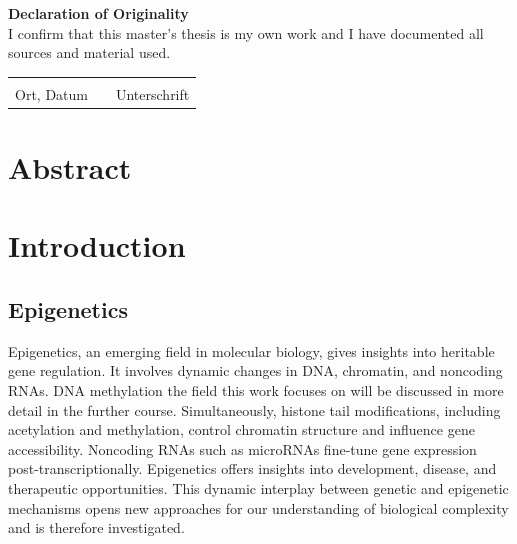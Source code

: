 \documentclass[pdftex,12pt,a4paper]{report}
\begin{document}
\newpage
\phantom{oben}
\vfill
\begin{center}
\large\textbf{Declaration of Originality}\normalsize\\
\vspace{0.5cm}
I confirm that this master's thesis is my own work and I have documented all sources and material used.\\
\vspace{1.5cm}
\begin{tabular}{lp{2em}l}
 \hspace{3cm}   && \hspace{3cm} \\\cline{1-1}\cline{3-3}
 Ort, Datum     && Unterschrift
\end{tabular}
\end{center}
\vfill

\tableofcontents

\chapter*{Abstract}

\chapter{Introduction}

\section{Epigenetics}
Epigenetics, an emerging field in molecular biology, gives insights into heritable gene regulation. It involves dynamic changes in DNA, chromatin, and noncoding RNAs. DNA methylation the field this work focuses on will be discussed in more detail in the further course. Simultaneously, histone tail modifications, including acetylation and methylation, control chromatin structure and influence gene accessibility\cite{epigenetics_histone}. Noncoding RNAs such as microRNAs fine-tune gene expression post-transcriptionally. Epigenetics offers insights into development, disease, and therapeutic opportunities\cite{epigenetics_nonRNA}. This dynamic interplay between genetic and epigenetic mechanisms opens new approaches for our understanding of biological complexity and is therefore investigated.
\end{document}
